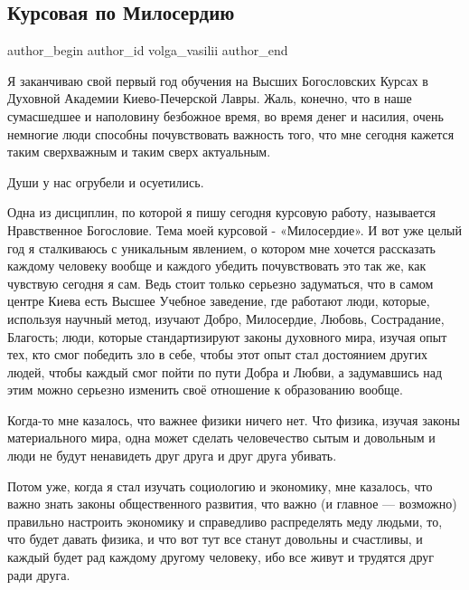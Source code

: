  
 
 
 
 
 
\subsection{Курсовая по Милосердию}
\label{sec:27_11_2020.fb.volga_vasilii.1.kursovaja_po_miloserdiju}
\ifcmt
	author_begin
   author_id volga_vasilii
	author_end
\fi

Я заканчиваю свой первый год обучения на Высших Богословских Курсах в Духовной
Академии Киево-Печерской Лавры. Жаль, конечно, что в наше сумасшедшее и
наполовину безбожное время, во время денег и насилия, очень немногие люди
способны почувствовать важность того, что мне сегодня кажется таким сверхважным
и таким сверх актуальным. 

Души у нас огрубели и осуетились.

Одна из дисциплин, по которой я пишу сегодня курсовую работу, называется
Нравственное Богословие. Тема моей курсовой - «Милосердие». И вот уже целый год
я сталкиваюсь с уникальным явлением, о котором мне хочется рассказать каждому
человеку вообще и каждого убедить почувствовать это так же, как чувствую
сегодня я сам. Ведь стоит только серьезно задуматься, что в самом центре Киева
есть Высшее Учебное заведение, где работают люди, которые, используя научный
метод, изучают Добро, Милосердие, Любовь, Сострадание, Благость; люди, которые
стандартизируют законы духовного мира, изучая опыт тех, кто смог победить зло в
себе, чтобы этот опыт стал достоянием других людей, чтобы каждый смог пойти по
пути Добра и Любви, а задумавшись над этим  можно серьезно изменить своё
отношение к образованию вообще.

Когда-то мне казалось, что важнее физики ничего нет. Что физика, изучая законы
материального мира, одна может сделать человечество сытым и довольным и люди не
будут ненавидеть друг друга и друг друга убивать. 

Потом уже, когда я стал изучать социологию и экономику, мне казалось, что важно
знать законы общественного развития, что важно (и главное --- возможно) правильно
настроить экономику и справедливо распределять меду людьми, то, что будет
давать физика, и что вот тут все станут довольны и счастливы, и каждый будет
рад каждому другому человеку, ибо все живут и трудятся друг ради друга. 

